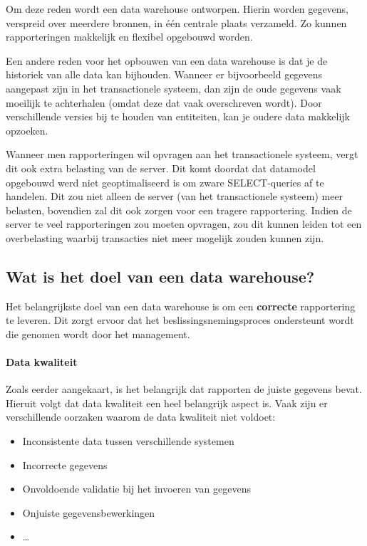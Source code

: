 Om deze reden wordt een data warehouse ontworpen. Hierin worden gegevens, verspreid over meerdere bronnen, in één centrale plaats verzameld. Zo kunnen rapporteringen makkelijk en flexibel opgebouwd worden. 

Een andere reden voor het opbouwen van een data warehouse is dat je de historiek van alle data kan bijhouden. Wanneer er bijvoorbeeld gegevens aangepast zijn in het transactionele systeem, dan zijn de oude gegevens vaak moeilijk te achterhalen (omdat deze dat vaak overschreven wordt). Door verschillende versies bij te houden van entiteiten, kan je oudere data makkelijk opzoeken.

Wanneer men rapporteringen wil opvragen aan het transactionele systeem, vergt dit ook extra belasting van de server. Dit komt doordat dat datamodel opgebouwd werd niet geoptimaliseerd is om zware SELECT-queries af te handelen. Dit zou niet alleen de server (van het transactionele systeem) meer belasten, bovendien zal dit ook zorgen voor een tragere rapportering. Indien de server te veel rapporteringen zou moeten opvragen, zou dit kunnen leiden tot een overbelasting waarbij transacties niet meer mogelijk zouden kunnen zijn. 


\subsection{Wat is het doel van een data warehouse?}
Het belangrijkste doel van een data warehouse is om een \textbf{correcte} rapportering te leveren. Dit zorgt ervoor dat het beslissingsnemingsproces ondersteunt wordt die genomen wordt door het management. 

\paragraph{Data kwaliteit}
Zoals eerder aangekaart, is het belangrijk dat rapporten de juiste gegevens bevat. Hieruit volgt dat data kwaliteit een heel belangrijk aspect is. Vaak zijn er verschillende oorzaken waarom de data kwaliteit niet voldoet:

\begin{itemize}
	\item Inconsistente data tussen verschillende systemen
	\item Incorrecte gegevens
	\item Onvoldoende validatie bij het invoeren van gegevens
	\item Onjuiste gegevensbewerkingen
	\item \ldots
\end{itemize}  
~\autocite{Helfert2002}

